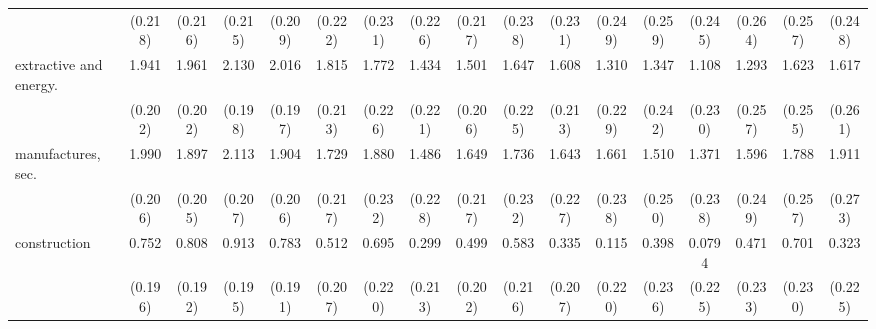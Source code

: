 {\begin{tabular}{l*{16}{c}}
                    &     (0.218)         &     (0.216)         &     (0.215)         &     (0.209)         &     (0.222)         &     (0.231)         &     (0.226)         &     (0.217)         &     (0.238)         &     (0.231)         &     (0.249)         &     (0.259)         &     (0.245)         &     (0.264)         &     (0.257)         &     (0.248)         \\
[1em]
extractive and energy.&       1.941\sym{***}&       1.961\sym{***}&       2.130\sym{***}&       2.016\sym{***}&       1.815\sym{***}&       1.772\sym{***}&       1.434\sym{***}&       1.501\sym{***}&       1.647\sym{***}&       1.608\sym{***}&       1.310\sym{***}&       1.347\sym{***}&       1.108\sym{***}&       1.293\sym{***}&       1.623\sym{***}&       1.617\sym{***}\\
                    &     (0.202)         &     (0.202)         &     (0.198)         &     (0.197)         &     (0.213)         &     (0.226)         &     (0.221)         &     (0.206)         &     (0.225)         &     (0.213)         &     (0.229)         &     (0.242)         &     (0.230)         &     (0.257)         &     (0.255)         &     (0.261)         \\
[1em]
manufactures, sec.  &       1.990\sym{***}&       1.897\sym{***}&       2.113\sym{***}&       1.904\sym{***}&       1.729\sym{***}&       1.880\sym{***}&       1.486\sym{***}&       1.649\sym{***}&       1.736\sym{***}&       1.643\sym{***}&       1.661\sym{***}&       1.510\sym{***}&       1.371\sym{***}&       1.596\sym{***}&       1.788\sym{***}&       1.911\sym{***}\\
                    &     (0.206)         &     (0.205)         &     (0.207)         &     (0.206)         &     (0.217)         &     (0.232)         &     (0.228)         &     (0.217)         &     (0.232)         &     (0.227)         &     (0.238)         &     (0.250)         &     (0.238)         &     (0.249)         &     (0.257)         &     (0.273)         \\
[1em]
construction        &       0.752\sym{***}&       0.808\sym{***}&       0.913\sym{***}&       0.783\sym{***}&       0.512\sym{*}  &       0.695\sym{**} &       0.299         &       0.499\sym{*}  &       0.583\sym{**} &       0.335         &       0.115         &       0.398         &      0.0794         &       0.471\sym{*}  &       0.701\sym{**} &       0.323         \\
                    &     (0.196)         &     (0.192)         &     (0.195)         &     (0.191)         &     (0.207)         &     (0.220)         &     (0.213)         &     (0.202)         &     (0.216)         &     (0.207)         &     (0.220)         &     (0.236)         &     (0.225)         &     (0.233)         &     (0.230)         &     (0.225)         \\

\end{tabular}}
